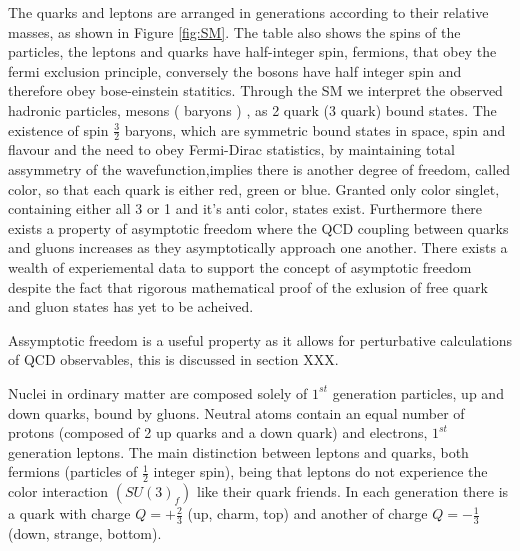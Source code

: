 The quarks and leptons are arranged in generations according to their relative masses, as shown in Figure \ref{fig:SM}. The table also shows the spins of the particles, the leptons and quarks have half-integer spin, fermions, that obey the fermi exclusion principle, conversely the bosons have half integer spin and therefore obey bose-einstein statitics. Through the SM we interpret the observed hadronic particles, mesons ( baryons ) , as 2 quark (3 quark) bound states. The existence of spin $\frac{3}{2}$ baryons, which are symmetric bound states in space, spin and flavour and the need to obey Fermi-Dirac statistics, by maintaining total assymmetry of the wavefunction,implies there is another degree of freedom, called color, so that each quark is either red, green or blue. Granted only color singlet, containing either all 3 or 1 and it's anti color, states exist. Furthermore there exists a property of asymptotic freedom where the QCD coupling between quarks and gluons increases as they asymptotically approach one another. There exists a wealth of experiemental data to support the concept of asymptotic freedom despite the fact that rigorous mathematical proof of the exlusion of free quark and gluon states has yet to be acheived.

Assymptotic freedom is a useful property as it allows for perturbative calculations of QCD observables, this is discussed in section XXX.


 Nuclei in ordinary matter are composed solely of $1^{st}$ generation particles, up and down quarks, bound by gluons. Neutral atoms contain an equal number of protons (composed of 2 up quarks and a down quark) and electrons, $1^{st}$ generation leptons. The main distinction between leptons and quarks, both fermions (particles of $\frac{1}{2}$ integer spin), being that leptons do not experience the color interaction $(SU(3)_f)$ like their quark friends. In each generation there is a quark with charge $Q = + \frac{2}{3}$ (up, charm, top) and another of charge $Q = - \frac{1}{3}$ (down, strange, bottom).



